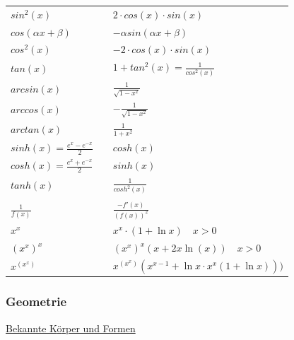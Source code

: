 \documentclass[6pt]{article}
\begin{document}
\begin{multicols*}{2}
\begin{onehalfspace}
\begin{tabular}{ l | l l }
					$sin^2(x)$										&&		$2 \cdot cos(x) \cdot sin(x)$															\\
					$cos(\alpha x + \beta)$					&&		$-\alpha sin(\alpha x + \beta)$ 														\\
					$cos^2(x)$ 										&& 		$-2 \cdot cos(x) \cdot sin(x)$															\\
					$tan(x)$											&&		$1 + tan^2(x) = \frac{1}{cos^2(x)}$ 													\\
					$arcsin(x)$										&&		$\frac{1}{\sqrt{1-x^2}}$																	\\
					$arccos(x)$										&&		$-\frac{1}{\sqrt{1-x^2}}$																	\\
					$arctan(x)$										&&		$\frac{1}{1+x^2}$																			\\
					$sinh(x) = \frac{e^x - e^{-x}}{2}$		&&		$cosh(x)$ 																						\\
					$cosh(x) = \frac{e^x + e^{-x}}{2}$	&&		$sinh(x)$ 																							\\
					$tanh(x)$											&&		$\frac{1}{cosh^2(x)}$ 																		\\
																																																\\
					$ \frac{1}{f(x)} $  								&&		 $ \frac{-f'(x)}{(f(x))^2} $ 																	\\
					$ x^x $  											&&  		$ x^x \cdot (1+\ln x) \quad \scriptstyle x > 0 $								\\
					$ (x^x)^x $ 										&&  		$ (x^x)^x(x+2x\ln(x)) \quad \scriptstyle x > 0 $ 							\\
					$ x^{(x^x)} $  									&&  		$ x^{(x^x)}(x^{x-1}+\ln x \cdot x^x (1+\ln x))) $ 

					

			
			\end{tabular}
		\end{onehalfspace}
		
		\vspace{5mm}
		\quad

\columnbreak
\subsubsection*{Geometrie}

\underline{Bekannte K{\"o}rper und Formen} \vspace{1mm}\\



\end{multicols*}
\end{document}
